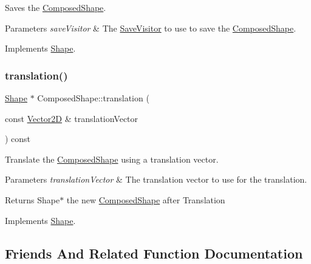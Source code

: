 Saves the \hyperlink{class_composed_shape}{Composed\+Shape}. 
\begin{DoxyParams}{Parameters}
{\em save\+Visitor} & The \hyperlink{class_save_visitor}{Save\+Visitor} to use to save the \hyperlink{class_composed_shape}{Composed\+Shape}. \\
\hline
\end{DoxyParams}


Implements \hyperlink{class_shape_ae1477829e1b06aad805b8b76312f87bc}{Shape}.

\hypertarget{class_composed_shape_a31337a3fc33ac1fb929edbb6ff485dcc}{}\label{class_composed_shape_a31337a3fc33ac1fb929edbb6ff485dcc} 
\subsubsection{\texorpdfstring{translation()}{translation()}}
{\footnotesize\ttfamily \hyperlink{class_shape}{Shape} $\ast$ Composed\+Shape\+::translation (\begin{DoxyParamCaption}\item[{const \hyperlink{class_vector2_d}{Vector2D} \&}]{translation\+Vector }\end{DoxyParamCaption}) const\hspace{0.3cm}{\ttfamily [virtual]}}

Translate the \hyperlink{class_composed_shape}{Composed\+Shape} using a translation vector. 
\begin{DoxyParams}{Parameters}
{\em translation\+Vector} & The translation vector to use for the translation. \\
\hline
\end{DoxyParams}
\begin{DoxyReturn}{Returns}
Shape$\ast$ the new \hyperlink{class_composed_shape}{Composed\+Shape} after Translation 
\end{DoxyReturn}


Implements \hyperlink{class_shape_ad3daca0d9bedf9aa15b92afab63c1de8}{Shape}.



\subsection{Friends And Related Function Documentation}
\hypertarget{class_composed_shape_a68ff1b04d83134ec6f6e949b45b63016}{}\label{class_composed_shape_a68ff1b04d83134ec6f6e949b45b63016} 
